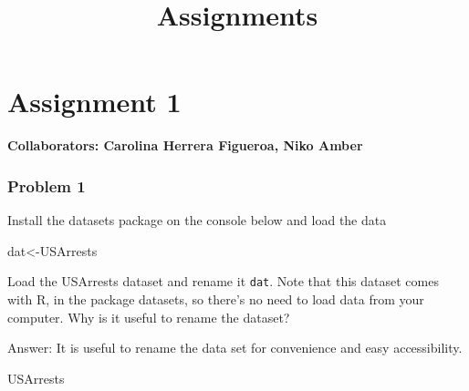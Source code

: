 \documentclass[
]{article}
\title{Assignments}
\author{}
\date{\vspace{-2.5em}}
\newenvironment{Shaded}{\begin{snugshade}}{\end{snugshade}}
\newcommand{\NormalTok}[1]{#1}
\begin{document}
\maketitle

{
\setcounter{tocdepth}{1}
\tableofcontents
}
\hypertarget{assignment-1}{%
\section{Assignment 1}\label{assignment-1}}

\textbf{Collaborators: Carolina Herrera Figueroa, Niko Amber}

\hypertarget{problem-1}{%
\subsubsection{Problem 1}\label{problem-1}}

Install the datasets package on the console below and load the data

\begin{Shaded}
\begin{Highlighting}[]
\NormalTok{dat<-USArrests}
\end{Highlighting}
\end{Shaded}

Load the USArrests dataset and rename it \texttt{dat}. Note that this
dataset comes with R, in the package datasets, so there's no need to
load data from your computer. Why is it useful to rename the dataset?

Answer: It is useful to rename the data set for convenience and easy
accessibility.

\begin{Shaded}
\begin{Highlighting}[]
\NormalTok{USArrests}
\end{Highlighting}
\end{Shaded}
\end{document}
